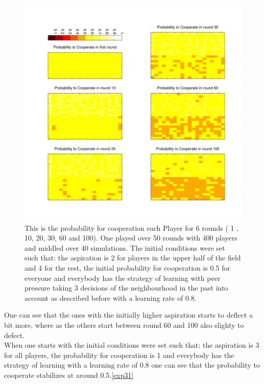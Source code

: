 \documentclass[11pt]{article}
\begin{document}
\begin{figure}
\centering
\includegraphics[scale=0.6]{ProbabilityToCooperateInDiffRound14.pdf}
\caption[]{This is the probability for cooperation each Player for 6 rounds ( 1 , 10, 20, 30, 60 and 100). One played over 50 rounds with 400 players and middled over 40 simulations. The initial conditions were set such that: the aspiration is 2 for players in the upper half of the field and 4 for the rest, the initial probability for cooperation is 0.5 for everyone and everybody has the strategy of learning with peer pressure taking 3 decisions of the neighbourhood in the past into account as described before with a learning rate of 0.8. }
\label{exp14}
\end{figure}

One can see that the ones with the initially higher aspiration starts to deflect a bit more, where as the others start between round 60 and 100 also slighty to defect.
\\When one starts with the initial conditions were set such that: the aspiration is 3 for all players, the probability for cooperation is 1 and everybody has the strategy of learning with a learning rate of 0.8 one can see that the probability to cooperate stabilizes at around 0.5.\ref{exp31}
\end{document}
